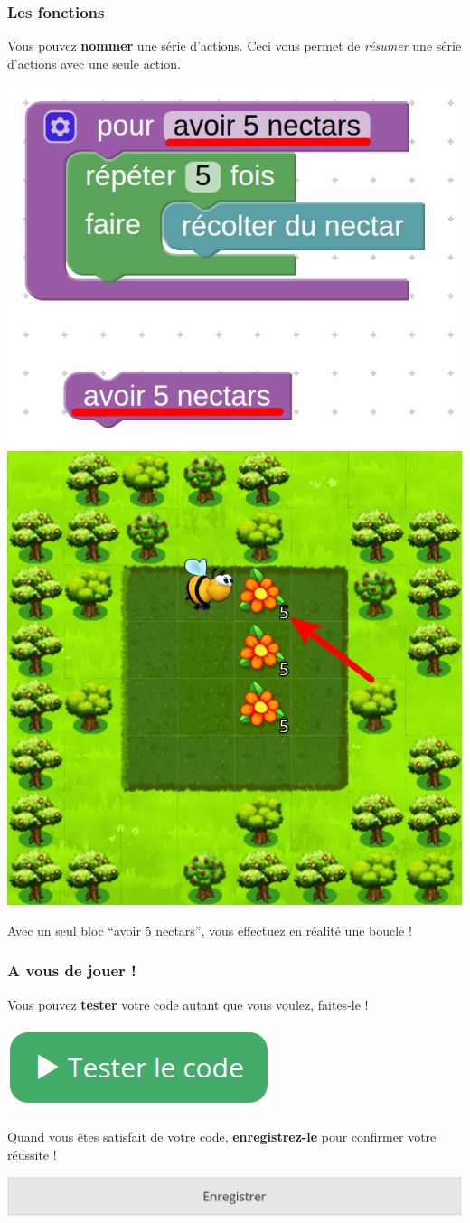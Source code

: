 \documentclass{beamer}
\begin{document}
\begin{frame}
	\frametitle{Les fonctions}

	Vous pouvez \textbf{nommer} une série d'actions. Ceci vous permet de \textit{résumer}
	une série d'actions avec une seule action.

	\includegraphics[width=0.45\linewidth]{blocks_function.png}
	\includegraphics[width=0.45\linewidth]{vizualization_function.png}

	Avec un seul bloc \enquote{avoir 5 nectars}, vous effectuez en réalité une boucle !
\end{frame}

\begin{frame}
	\frametitle{A vous de jouer !}

	Vous pouvez \textbf{tester} votre code autant que vous voulez, faites-le !

	\begin{center}
		\includegraphics[width=0.5\linewidth]{testcode.png}
	\end{center}

	Quand vous êtes satisfait de votre code, \textbf{enregistrez-le} pour confirmer
	votre réussite !

	\begin{center}
		\includegraphics[width=\linewidth]{save.png}
	\end{center}
\end{frame}
\end{document}
